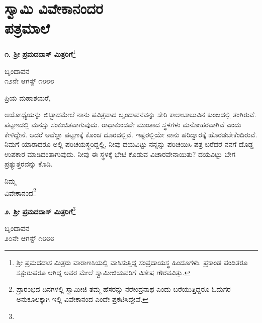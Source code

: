 
\chapter[ಸ್ವಾಮಿ ವಿವೇಕಾನಂದರ ಪತ್ರಮಾಲೆ]{ಸ್ವಾಮಿ ವಿವೇಕಾನಂದರ\\ಪತ್ರಮಾಲೆ}

\begin{center}
\textbf{೧. ಶ‍್ರೀ ಪ್ರಮದದಾಸ್ ಮಿತ್ರರಿಗೆ}\footnote{ಶ‍್ರೀ ಪ್ರಮದದಾಸ ಮಿತ್ರರು ವಾರಾಣಸಿಯಲ್ಲಿ ವಾಸಿಸುತ್ತಿದ್ದ ಸಂಪ್ರದಾಯಸ್ಥ ಹಿಂದೂಗಳು. ಪ್ರಕಾಂಡ ಪಂಡಿತರೂ ಸತ್ಪುರುಷರೂ ಆಗಿದ್ದ ಅವರ ಮೇಲೆ ಸ್ವಾಮೀಜಿಯವರಿಗೆ ವಿಶೇಷ ಗೌರವವಿತ್ತು.}
\end{center}

\vspace{-0.7cm}
\begin{flushright}
ಬೃಂದಾವನ\\೧೨ನೇ ಆಗಸ್ಟ್ ೧೮೮೮
\end{flushright}

\noindent
ಪ್ರಿಯ ಮಹಾಶಯರೆ,

ಅಯೋಧ್ಯೆಯನ್ನು ಬಿಟ್ಟಾದಮೇಲೆ ನಾನು ಪವಿತ್ರವಾದ ಬೃಂದಾವನವನ್ನು ಸೇರಿ ಕಾಲಾಬಾಬುವಿನ ಕುಂಜದಲ್ಲಿ ತಂಗಿರುವೆ. ಪಟ್ಟಣದಲ್ಲಿ ಮನಸ್ಸು ಸಂಕುಚಿತವಾಗುವುದು. ರಾಧಾಕುಂಡವೇ ಮುಂತಾದ ಸ್ಥಳಗಳು ಮನೋಹರವಾಗಿವೆ ಎಂದು ಕೇಳಿದ್ದೇನೆ. ಆದರೆ ಅವೆಲ್ಲಾ ಪಟ್ಟಣಕ್ಕೆ ಕೊಂಚ ದೂರದಲ್ಲಿವೆ. ಇಷ್ಟರಲ್ಲಿಯೇ ನಾನು ಹರಿದ್ವಾರಕ್ಕೆ ಹೊರಡಬೇಕೆಂದಿರುವೆ. ನಿಮಗೆ ಯಾರಾದರೂ ಅಲ್ಲಿ ಪರಿಚಯಸ್ಥರಿದ್ದಲ್ಲಿ, ನೀವು ದಯವಿಟ್ಟು ನನ್ನನ್ನು ಪರಿಚಯಿಸಿ ಪತ್ರ ಬರೆದರೆ ನನಗೆ ದೊಡ್ಡ ಉಪಕಾರ ಮಾಡಿದಂತಾಗುವುದು. ನೀವು ಈ ಸ್ಥಳಕ್ಕೆ ಭೇಟಿ ಕೊಡುವ ವಿಚಾರವೇನಾಯಿತು? ದಯವಿಟ್ಟು ಬೇಗ ಪ್ರತ್ಯುತ್ತರವನ್ನು ಕೊಡಿ.

\vspace{-0.5cm}

{\flushright
ನಿಮ್ಮ\\ವಿವೇಕಾನಂದ\footnote{ಪ್ರಾರಂಭದ ದಿನಗಳಲ್ಲಿ ಸ್ವಾಮೀಜಿ ತಮ್ಮ ಹೆಸರನ್ನು ನರೇಂದ್ರನಾಥ ಎಂದು ಬರೆಯುತ್ತಿದ್ದರೂ ಓದುಗರ ಅನುಕೂಲಕ್ಕಾಗಿ ಇಲ್ಲಿ ವಿವೇಕಾನಂದ ಎಂದೇ ಪ್ರಕಟಿಸಿದ್ದೇವೆ.

}\par}

\vspace{-0.3cm}

\begin{center}
\textbf{೨. ಶ‍್ರೀ ಪ್ರಮದದಾಸ್ ಮಿತ್ರರಿಗೆ}\footnote{}
\end{center}

\vspace{-0.5cm}

\begin{flushright}
ಬೃಂದಾವನ\\೨೦ನೇ ಆಗಸ್ಟ್ ೧೮೮೮
\end{flushright}

